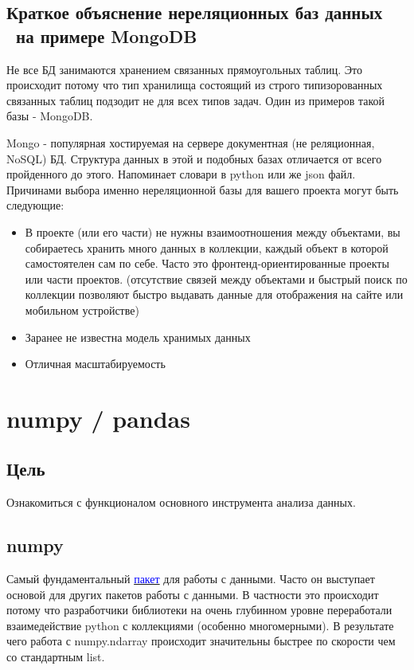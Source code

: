 \documentclass[12pt, a4paper]{article}
\begin{document}
{\subsection{Краткое объяснение нереляционных баз данных \
на примере MongoDB}

Не все БД занимаются хранением связанных прямоугольных таблиц. 
Это происходит потому что тип хранилища состоящий из строго 
типизорованных связанных таблиц подзодит не для всех типов задач.
Один из примеров такой базы - MongoDB.

\vspace{1em}

Mongo - популярная хостируемая на сервере документная 
(не реляционная, NoSQL) БД. Структура данных в этой и 
подобных базах отличается от всего пройденного до этого.
Напоминает словари в python или же json файл.
Причинами выбора именно нереляционной базы для вашего 
проекта могут быть следующие:

\begin{itemize}
    \item В проекте (или его части) не нужны взаимоотношения 
    между объектами, вы собираетесь хранить много данных в 
    коллекции, каждый объект в которой самостоятелен сам по 
    себе. Часто это фронтенд-ориентированные проекты или части 
    проектов. (отсутствие связей между объектами и быстрый поиск 
    по коллекции позволяют быстро выдавать данные для 
    отображения на сайте или мобильном устройстве)
    \item Заранее не известна модель хранимых данных 
    \item Отличная масштабируемость
\end{itemize}

\section{numpy / pandas}

\subsection{Цель}

Ознакомиться с функционалом основного инструмента анализа данных.

\subsection{numpy}

Самый фундаментальный \href{https://numpy.org/}
{\textcolor{blue}{пакет}} для работы с данными. Часто он 
выступает основой для других пакетов работы с данными. В 
частности это происходит потому что разработчики библиотеки 
на очень глубинном уровне переработали взаимедействие python 
с коллекциями (особенно многомерными). В результате чего 
работа с numpy.ndarray происходит значительны быстрее по 
скорости чем со стандартным list.

}
\end{document}
